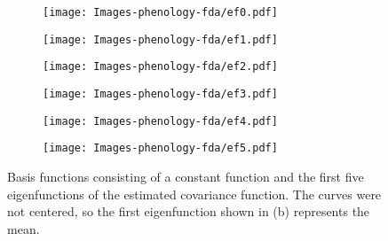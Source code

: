 \begin{figure}
	
	\centering 
	\begin{subfigure}
		[b]{0.32 
		\textwidth} \centering 
		\texttt{[image: Images-phenology-fda/ef0.pdf]} \caption{} \label{} 
	\end{subfigure}
	
	\begin{subfigure}
		[b]{0.32 
		\textwidth} \centering 
		\texttt{[image: Images-phenology-fda/ef1.pdf]} \caption{} \label{} 
	\end{subfigure}
	\begin{subfigure}
		[b]{0.32 
		\textwidth} \centering 
		\texttt{[image: Images-phenology-fda/ef2.pdf]} \caption{} \label{} 
	\end{subfigure}
	
	\begin{subfigure}
		[b]{0.32 
		\textwidth} \centering 
		\texttt{[image: Images-phenology-fda/ef3.pdf]} \caption{} \label{} 
	\end{subfigure}
	\begin{subfigure}
		[b]{0.32 
		\textwidth} \centering 
		\texttt{[image: Images-phenology-fda/ef4.pdf]} \caption{} \label{} 
	\end{subfigure}
	
	\begin{subfigure}
		[b]{0.32 
		\textwidth} \centering 
		\texttt{[image: Images-phenology-fda/ef5.pdf]} \caption{} \label{} 
	\end{subfigure}
	\caption{Basis functions consisting of a constant function and the first five eigenfunctions of the estimated covariance function. The curves were not centered, so the first eigenfunction shown in (b) represents the mean.} \label{fig:basis functions} 
\end{figure}
